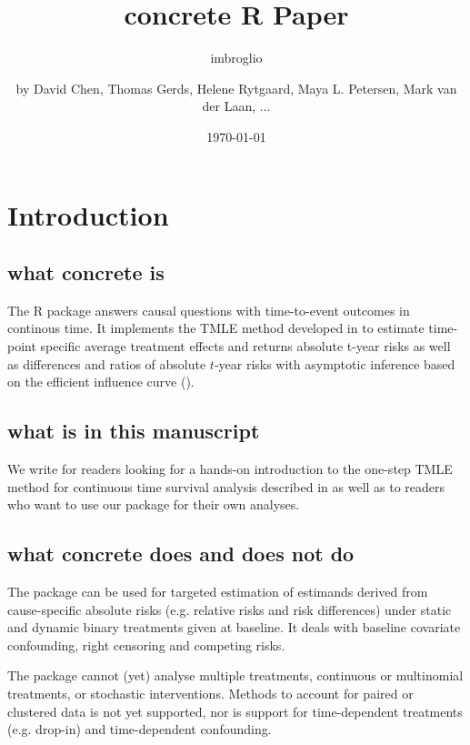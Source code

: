 \documentclass{report}
\author{imbroglio}
\date{\today}
\title{}
\newcommand{\1}{\ensuremath{\mathbf{1}}}
\begin{document}
\title{concrete R Paper}
\subtitle{}
\author{by David Chen, Thomas Gerds, Helene Rytgaard, Maya L. Petersen, Mark van der Laan, ...}

\maketitle

\section{Introduction}
\label{intro}
\subsection{what concrete is}
\label{sec:orgfa58f06}

The R package  answers causal questions with time-to-event outcomes in continous time. It implements the TMLE method developed in \cite{rytgaard_one-step_2021} to estimate time-point specific average treatment effects and returns absolute t-year risks as well as differences and ratios of absolute \(t\)-year risks with asymptotic inference based on the efficient influence curve (\cite{laan_unified_2003-1}).

\subsection{what is in this manuscript}
\label{sec:org6837d6d}

We write for readers looking for a hands-on introduction to the one-step TMLE method for
continuous time survival analysis described in \cite{rytgaard_one-step_2021} as well as to readers
who want to use our package for their own analyses.

\subsection{what concrete does and does not do}
\label{sec:orgea90b1b}
The package can be used for targeted estimation of estimands derived from cause-specific absolute risks (e.g. relative risks and risk differences) under static and dynamic binary treatments given at baseline. It deals with baseline covariate confounding, right censoring and competing risks.

The package cannot (yet) analyse multiple treatments, continuous or multinomial treatments, or stochastic interventions. Methods to account for paired or clustered data is not yet supported, nor is support for time-dependent treatments (e.g. drop-in) and time-dependent confounding.
\end{document}
